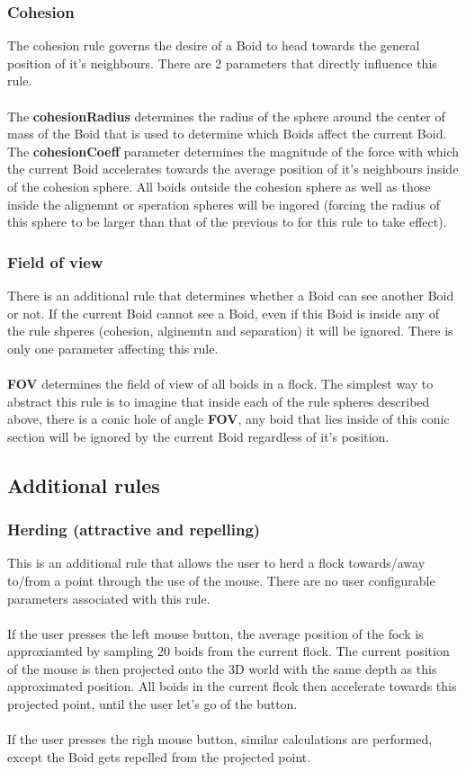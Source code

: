 \documentclass[12pt]{article}
\begin{document}
\subsubsection{Cohesion}
The cohesion rule governs the desire of a Boid to head towards the general position of it's neighbours. There are 2 parameters that directly influence this rule.
\\ \\
The \textbf{cohesionRadius} determines the radius of the sphere around the center of mass of the Boid that is used to determine which Boids affect the current Boid. The \textbf{cohesionCoeff} parameter determines the magnitude of the force with which the current Boid  accelerates towards the average position of it's neighbours inside of the cohesion sphere. All boids outside the cohesion sphere as well as those inside the alignemnt or speration spheres will be ingored (forcing the radius of this sphere to be larger than that of the previous to for this rule to take effect).

\subsubsection{Field of view}
There is an additional rule that determines whether a Boid can see another Boid or not. If the current Boid cannot see a Boid, even if this Boid is inside any of the rule shperes (cohesion, alginemtn and separation) it will be ignored. There is only one parameter affecting this rule.
\\ \\
\textbf{FOV} determines the field of view of all boids in a flock. The simplest way to abstract this rule is to imagine that inside each of the rule spheres described above, there is a conic hole of angle \textbf{FOV}, any boid that lies inside of this conic section will be ignored by the current Boid regardless of it's position.

\subsection{Additional rules}
\subsubsection{Herding (attractive and repelling)}
This is an additional rule that allows the user to herd a flock towards/away to/from a point through the use of the mouse. There are no user configurable parameters associated with this rule.
\\ \\
If the user presses the left mouse button, the average position of the fock is approxiamted by sampling 20 boids from the current flock. The current position of the mouse is then projected onto the 3D world with the same depth as this approximated position. All boids in the current flcok then accelerate towards this projected point, until the user let's go of the button.
\\ \\
If the user presses the righ mouse button, similar calculations are performed, except the Boid gets repelled from the projected point.
\end{document}
